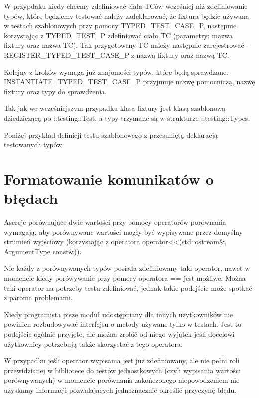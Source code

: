 \documentclass[12pt,a4paper,notitlepage]{report}
\begin{document}
W przypdaku kiedy checmy zdefiniować ciała TCów wcześniej niż zdefiniowanie typów, które będziemy testować należy zadeklarować, że fixtura będzie używana w testach szablonowych przy pomocy TYPED{\_}TEST{\_}CASE{\_}P, następnie korzystając z TYPED{\_}TEST{\_}P zdefiniować ciało TC (parametry: mazwa fixtury oraz nazwa TC). Tak przygotowany TC należy następnie zarejestrować - REGISTER{\_}TYPED{\_}TEST{\_}CASE{\_}P z nazwą fixtury oraz nazwą TC.

Kolejny z kroków wymaga już znajomości typów, które będą sprawdzane. INSTANTIATE{\_}TYPED{\_}TEST{\_}CASE{\_}P przyjmuje nazwę pomocniczą, nazwę fixtury oraz typy do sprawdzenia.

Tak jak we wcześniejszym przypadku klasa fixtury jest klasą szablonową dziedziczącą po ::testing::Test, a typy trzymane są w strukturze ::testing::Types.

Poniżej przykład definicji testu szablonowego z przesuniętą deklaracją testowanych typów.

			

\chapter{Formatowanie komunikatów o błędach}

Asercje porównujące dwie wartości przy pomocy operatorów porównania wymagają, aby porównywane wartości mogły być wypisywane przez domyślny strumień wyjściowy (korzystając z operatora operator<<(std::ostream\&, ArgumentType const\&)). 

Nie każdy z porównywanych typów posiada zdefiniowany taki operator, nawet w momencie kiedy porówywanie przy pomocy operatora == jest możliwe. Można taki operator na potrzeby testu zdefiniować, jednak takie podejście może spotkać z paroma problemami.

Kiedy programista pisze moduł udostępniany dla innych użytkowników nie powinien rozbudowywać interfejsu o metody używane tylko w testach. Jest to podejście ogólnie przyjęte, ale można zrobić od niego wyjątek jeśli docelowi użytkownicy potrzebują także skorzystać z tego operatora.

W przypadku jeśli operator wypisania jest już zdefiniowany, ale nie pełni roli przewidzianej w bibliotece do testów jednostkowych (czyli wypisania wartości porównywanych) w momencie porównania zakończonego niepowodzeniem nie uzyskamy informacji pozwalających jednoznacznie określić przyczynę błędu.
\end{document}
